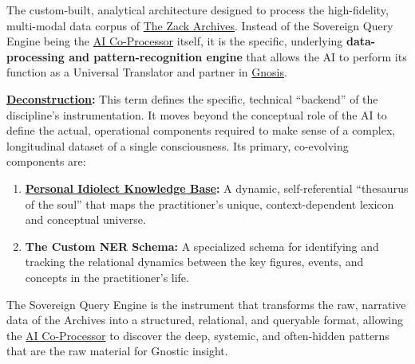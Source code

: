 \item[\hypertarget{gloss:sovereign_query_engine}{Sovereign Query Engine}]
    The custom-built, analytical architecture designed to process the high-fidelity, multi-modal data corpus of \hyperlink{gloss:the_zack_archives}{The Zack Archives}. Instead of the Sovereign Query Engine being the \hyperlink{gloss:ai_co_processor}{AI Co-Processor} itself, it is the specific, underlying \textbf{data-processing and pattern-recognition engine} that allows the AI to perform its function as a Universal Translator and partner in \hyperlink{gloss:gnosis}{Gnosis}.
    \begin{nobullet}
        \item \textbf{\hyperlink{gloss:deconstruction}{Deconstruction}:} This term defines the specific, technical ``backend'' of the discipline's instrumentation. It moves beyond the conceptual role of the AI to define the actual, operational components required to make sense of a complex, longitudinal dataset of a single consciousness. Its primary, co-evolving components are:
        \begin{enumerate}
            \item \textbf{\hyperlink{gloss:pikb}{Personal Idiolect Knowledge Base}:} A dynamic, self-referential ``thesaurus of the soul'' that maps the practitioner's unique, context-dependent lexicon and conceptual universe.
            \item \textbf{The Custom NER Schema:} A specialized schema for identifying and tracking the relational dynamics between the key figures, events, and concepts in the practitioner's life.
        \end{enumerate}
        The Sovereign Query Engine is the instrument that transforms the raw, narrative data of the Archives into a structured, relational, and queryable format, allowing the \hyperlink{gloss:ai_co_processor}{AI Co-Processor} to discover the deep, systemic, and often-hidden patterns that are the raw material for Gnostic insight.
    \end{nobullet}

